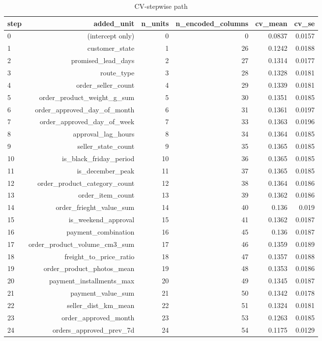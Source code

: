 \begin{table}[htbp]
\centering
\small
\caption{CV-stepwise path}
\begin{tabular}{lrrrrr}
\toprule
step & added\_unit & n\_units & n\_encoded\_columns & cv\_mean & cv\_se \\
\midrule
0 & (intercept only) & 0 & 0 & 0.0837 & 0.0157 \\
1 & customer\_state & 1 & 26 & 0.1242 & 0.0188 \\
2 & promised\_lead\_days & 2 & 27 & 0.1314 & 0.0177 \\
3 & route\_type & 3 & 28 & 0.1328 & 0.0181 \\
4 & order\_seller\_count & 4 & 29 & 0.1339 & 0.0181 \\
5 & order\_product\_weight\_g\_sum & 5 & 30 & 0.1351 & 0.0185 \\
6 & order\_approved\_day\_of\_month & 6 & 31 & 0.1361 & 0.0197 \\
7 & order\_approved\_day\_of\_week & 7 & 33 & 0.1363 & 0.0196 \\
8 & approval\_lag\_hours & 8 & 34 & 0.1364 & 0.0185 \\
9 & seller\_state\_count & 9 & 35 & 0.1365 & 0.0185 \\
10 & is\_black\_friday\_period & 10 & 36 & 0.1365 & 0.0185 \\
11 & is\_december\_peak & 11 & 37 & 0.1365 & 0.0185 \\
12 & order\_product\_category\_count & 12 & 38 & 0.1364 & 0.0186 \\
13 & order\_item\_count & 13 & 39 & 0.1362 & 0.0186 \\
14 & order\_frieght\_value\_sum & 14 & 40 & 0.136 & 0.019 \\
15 & is\_weekend\_approval & 15 & 41 & 0.1362 & 0.0187 \\
16 & payment\_combination & 16 & 45 & 0.136 & 0.0187 \\
17 & order\_product\_volume\_cm3\_sum & 17 & 46 & 0.1359 & 0.0189 \\
18 & freight\_to\_price\_ratio & 18 & 47 & 0.1357 & 0.0188 \\
19 & order\_product\_photos\_mean & 19 & 48 & 0.1353 & 0.0186 \\
20 & payment\_installments\_max & 20 & 49 & 0.1345 & 0.0187 \\
21 & payment\_value\_sum & 21 & 50 & 0.1342 & 0.0178 \\
22 & seller\_dist\_km\_mean & 22 & 51 & 0.1324 & 0.0181 \\
23 & order\_approved\_month & 23 & 53 & 0.1263 & 0.0185 \\
24 & orders\_approved\_prev\_7d & 24 & 54 & 0.1175 & 0.0129 \\
\bottomrule
\end{tabular}
\par\smallskip\begin{minipage}{\linewidth}\footnotesize \end{minipage}
\end{table}

